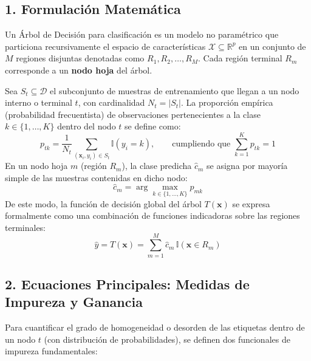 \documentclass[11pt, a4paper]{article}
\begin{document}
\subsection*{1. Formulación Matemática}
Un Árbol de Decisión para clasificación es un modelo no paramétrico que particiona recursivamente el espacio de características $\mathcal{X} \subseteq \mathbb{R}^p$ en un conjunto de $M$ regiones disjuntas denotadas como $R_1, R_2, \dots, R_M$. Cada región terminal $R_m$ corresponde a un \textbf{nodo hoja} del árbol.

Sea $S_t \subseteq \mathcal{D}$ el subconjunto de muestras de entrenamiento que llegan a un nodo interno o terminal $t$, con cardinalidad $N_t = |S_t|$. La proporción empírica (probabilidad frecuentista) de observaciones pertenecientes a la clase $k \in \{1, \dots, K\}$ dentro del nodo $t$ se define como:
\begin{equation}
    p_{tk} = \frac{1}{N_t} \sum_{(\mathbf{x}_i, y_i) \in S_t} \mathbb{I}(y_i = k), \qquad \text{cumpliendo que } \sum_{k=1}^{K} p_{tk} = 1
\end{equation}
En un nodo hoja $m$ (región $R_m$), la clase predicha $\hat{c}_m$ se asigna por mayoría simple de las muestras contenidas en dicho nodo:
\begin{equation}
    \hat{c}_m = \arg\max_{k \in \{1, \dots, K\}} p_{mk}
\end{equation}
De este modo, la función de decisión global del árbol $T(\mathbf{x})$ se expresa formalmente como una combinación de funciones indicadoras sobre las regiones terminales:
\begin{equation}
    \hat{y} = T(\mathbf{x}) = \sum_{m=1}^{M} \hat{c}_m \, \mathbb{I}(\mathbf{x} \in R_m)
\end{equation}

\subsection*{2. Ecuaciones Principales: Medidas de Impureza y Ganancia}
Para cuantificar el grado de homogeneidad o desorden de las etiquetas dentro de un nodo $t$ (con distribución de probabilidades), se definen dos funcionales de impureza fundamentales:
\end{document}
